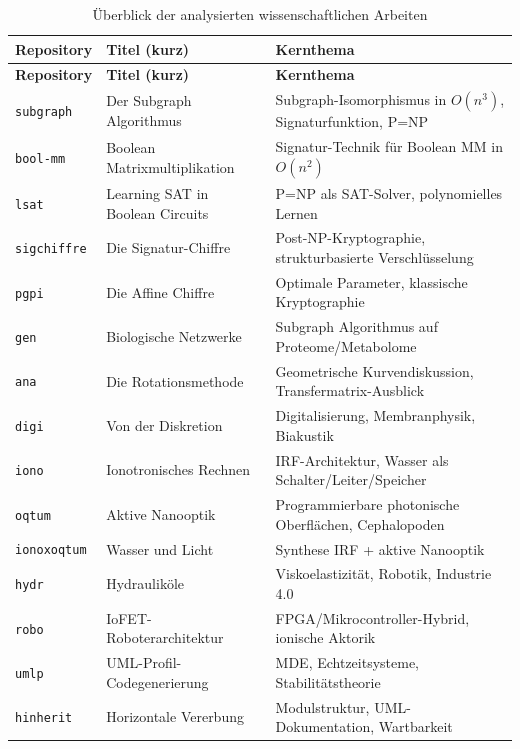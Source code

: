 ﻿\documentclass[a4paper,12pt]{scrreprt}
\theoremstyle{definition}
\begin{document}
\begin{longtable}{p{2.8cm} p{5.5cm} p{5.5cm}}
\caption{Überblick der analysierten wissenschaftlichen Arbeiten}
\label{tab:repos}\\
\toprule
\textbf{Repository} & \textbf{Titel (kurz)} & \textbf{Kernthema} \\
\midrule
\endfirsthead
\toprule
\textbf{Repository} & \textbf{Titel (kurz)} & \textbf{Kernthema} \\
\midrule
\endhead
\bottomrule
\endfoot
\texttt{subgraph} & Der Subgraph Algorithmus & Subgraph-Isomorphismus in $O(n^3)$, Signaturfunktion, P=NP \\[4pt]
\texttt{bool-mm}  & Boolean Matrixmultiplikation & Signatur-Technik für Boolean MM in $O(n^2)$ \\[4pt]
\texttt{lsat}     & Learning SAT in Boolean Circuits & P=NP als SAT-Solver, polynomielles Lernen \\[4pt]
\texttt{sigchiffre} & Die Signatur-Chiffre & Post-NP-Kryptographie, strukturbasierte Verschlüsselung \\[4pt]
\texttt{pgpi}     & Die Affine Chiffre & Optimale Parameter, klassische Kryptographie \\[4pt]
\texttt{gen}      & Biologische Netzwerke & Subgraph Algorithmus auf Proteome/Metabolome \\[4pt]
\texttt{ana}      & Die Rotationsmethode & Geometrische Kurvendiskussion, Transfermatrix-Ausblick \\[4pt]
\texttt{digi}     & Von der Diskretion & Digitalisierung, Membranphysik, Biakustik \\[4pt]
\texttt{iono}     & Ionotronisches Rechnen & IRF-Architektur, Wasser als Schalter/Leiter/Speicher \\[4pt]
\texttt{oqtum}    & Aktive Nanooptik & Programmierbare photonische Oberflächen, Cephalopoden \\[4pt]
\texttt{ionoxoqtum} & Wasser und Licht & Synthese IRF + aktive Nanooptik \\[4pt]
\texttt{hydr}     & Hydrauliköle & Viskoelastizität, Robotik, Industrie 4.0 \\[4pt]
\texttt{robo}     & IoFET-Roboterarchitektur & FPGA/Mikrocontroller-Hybrid, ionische Aktorik \\[4pt]
\texttt{umlp}     & UML-Profil-Codegenerierung & MDE, Echtzeitsysteme, Stabilitätstheorie \\[4pt]
\texttt{hinherit} & Horizontale Vererbung & Modulstruktur, UML-Dokumentation, Wartbarkeit \\
\end{longtable}
\end{document}
